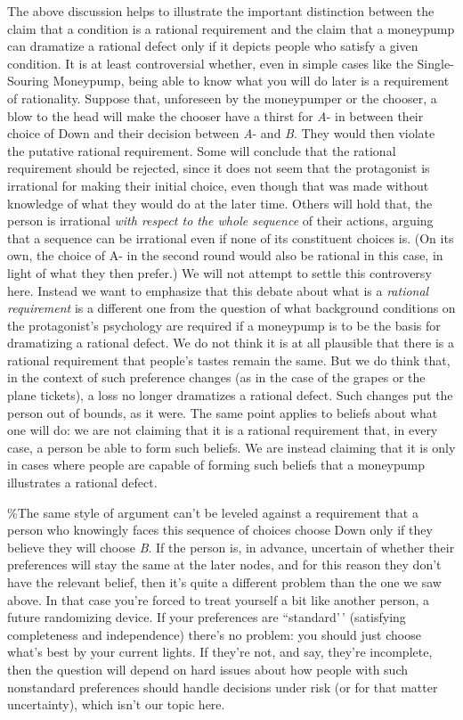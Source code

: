 \documentclass[
  11pt,
  letterpaper,
  DIV=11,
  numbers=noendperiod,
  twoside]{scrartcl}
\begin{document}
The above discussion helps to illustrate the important distinction
between the claim that a condition is a rational requirement and the
claim that a moneypump can dramatize a rational defect only if it
depicts people who satisfy a given condition. It is at least
controversial whether, even in simple cases like the Single-Souring
Moneypump, being able to know what you will do later is a requirement of
rationality. Suppose that, unforeseen by the moneypumper or the chooser,
a blow to the head will make the chooser have a thirst for \emph{A}- in
between their choice of Down and their decision between \emph{A}- and
\emph{B}. They would then violate the putative rational requirement.
Some will conclude that the rational requirement should be rejected,
since it does not seem that the protagonist is irrational for making
their initial choice, even though that was made without knowledge of
what they would do at the later time. Others will hold that, the person
is irrational \emph{with respect to the whole sequence} of their
actions, arguing that a sequence can be irrational even if none of its
constituent choices is. (On its own, the choice of A- in the second
round would also be rational in this case, in light of what they then
prefer.) We will not attempt to settle this controversy here. Instead we
want to emphasize that this debate about what is a
\emph{rational requirement} is a different one from the question of what
background conditions on the protagonist's psychology are required if a
moneypump is to be the basis for dramatizing a rational defect. We do
not think it is at all plausible that there is a rational requirement
that people's tastes remain the same. But we do think that, in the
context of such preference changes (as in the case of the grapes or the
plane tickets), a loss no longer dramatizes a rational defect. Such
changes put the person out of bounds, as it were. The same point applies
to beliefs about what one will do: we are not claiming that it is a
rational requirement that, in every case, a person be able to form such
beliefs. We are instead claiming that it is only in cases where people
are capable of forming such beliefs that a moneypump illustrates a
rational defect.

\%The same style of argument can't be leveled against a requirement that
a person who knowingly faces this sequence of choices choose Down only
if they believe they will choose \emph{B}. If the person is, in advance,
uncertain of whether their preferences will stay the same at the later
nodes, and for this reason they don't have the relevant belief, then
it's quite a different problem than the one we saw above. In that case
you're forced to treat yourself a bit like another person, a future
randomizing device. If your preferences are ``standard'\,' (satisfying
completeness and independence) there's no problem: you should just
choose what's best by your current lights. If they're not, and say,
they're incomplete, then the question will depend on hard issues about
how people with such nonstandard preferences should handle decisions
under risk (or for that matter uncertainty), which isn't our topic here.
\end{document}
